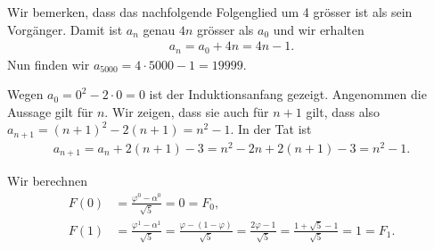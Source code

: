 \begin{myanswer}[myexercise:0404]
	Wir bemerken, dass das nachfolgende Folgenglied um 4 grösser ist als sein Vorgänger. Damit ist $a_n$ genau $4n$ grösser als $a_0$ und wir erhalten
	\begin{align*}
		a_n = a_0 + 4n = 4n - 1.
	\end{align*}
	Nun finden wir $a_{5000} = 4\cdot 5000 - 1 = 19999$.
\end{myanswer}



\begin{myanswer}[myexercise:0405]
	Wegen $a_0 = 0^2 - 2\cdot 0 = 0$ ist der Induktionsanfang gezeigt. Angenommen die Aussage gilt für $n$. Wir zeigen, dass sie auch für $n+1$ gilt, dass also $a_{n+1} = (n+1)^2 - 2(n+1) = n^2 - 1$. In der Tat ist
	\begin{align*}
		a_{n+1} = a_n + 2(n+1) - 3 = n^2 - 2n + 2(n+1) - 3 = n^2 - 1.
	\end{align*}
\end{myanswer}


\begin{myanswer}[myexercise:0478]
	Wir berechnen
	\begin{align*}
		F(0) & = \frac{\varphi^0-\alpha^0}{\sqrt{5}} = 0 = F_0,                                                                                                      \\
		F(1) & = \frac{\varphi^1-\alpha^1}{\sqrt{5}} = \frac{\varphi-(1-\varphi)}{\sqrt{5}} = \frac{2\varphi-1}{\sqrt{5}} = \frac{1+\sqrt{5}-1}{\sqrt{5}} = 1 = F_1.
	\end{align*}
\end{myanswer}


